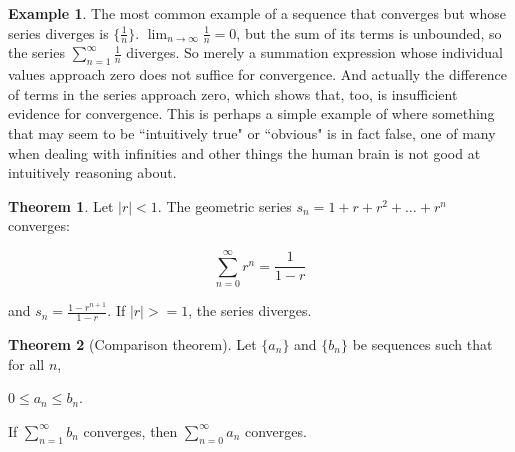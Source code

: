 \documentclass{article}
\theoremstyle{definition}
\newtheorem{example}{Example}[section]
\newtheorem{theorem}{Theorem}[section]
\begin{document}
\begin{example} \label{harmonic-series-divergence}
The most common example of a sequence that converges but whose series diverges is $\{\frac{1}{n}\}$. $\lim_{n \to \infty} \frac{1}{n} = 0$, but the sum of its terms is unbounded, so the series $\sum\limits_{n=1}^\infty \frac{1}{n}$ diverges. So merely a summation expression whose individual values approach zero does not suffice for convergence. And actually the difference of terms in the series approach zero, which shows that, too, is insufficient evidence for convergence. This is perhaps a simple example of where something that may seem to be ``intuitively true" or ``obvious" is in fact false, one of many when dealing with infinities and other things the human brain is not good at intuitively reasoning about.
\end{example}

\begin{theorem} \label{geometric-series}
Let $|r| < 1$. The geometric series $s_n = 1 + r + r^2 + \ldots + r^n$ converges:

\begin{equation*}
\sum\limits_{n=0}^\infty r^n = \frac{1}{1-r}
\end{equation*}

and $s_n = \frac{1 - r^{n+1}}{1 - r}$. If $|r| >= 1$, the series diverges.
\end{theorem}

\begin{theorem}[Comparison theorem]
Let $\{a_n\}$ and $\{b_n\}$ be sequences such that for all $n$,

\begin{center}
$0 \leq a_n \leq b_n$.
\end{center}

If $\sum\limits_{n=1}^\infty b_n$ converges, then $\sum\limits_{n=0}^\infty a_n$ converges.
\end{theorem}
\end{document}
